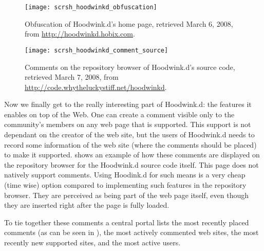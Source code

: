 \begin{figure}
  \centering
  \texttt{[image: scrsh\_hoodwinkd\_obfuscation]}
  \caption[Hoodwink.d Obfuscation]{
    Obfuscation of Hoodwink.d's home page,
    retrieved March 6, 2008, from
    \url{http://hoodwinkd.hobix.com}.
  }
  \label{figure:scrsh.hoodwinkd.obfuscation}
\end{figure}

\begin{figure}
  \begin{whole}
    \centering
    \texttt{[image: scrsh\_hoodwinkd\_comment\_source]}
    \caption[Hoodwink.d Comments]{
      Comments on the repository browser of Hoodwink.d's source code,
      retrieved March 7, 2008, from
      \url{http://code.whytheluckystiff.net/hoodwinkd}.
    }
    \label{figure:scrsh.hoodwinkd.comment.source}
  \end{whole}
\end{figure}

Now we finally get to the really interesting part of Hoodwink.d: the features
it enables on top of the Web. One can create a comment visible only to the
community's members on any web page that is supported. This support is not
dependant on the creator of the web site, but the users of Hoodwink.d needs to
record some information of the web site (where the comments should be placed)
to make it supported.  shows an
example of how these comments are displayed on the repository browser for
the Hoodwink.d source code itself. This page does not natively support
comments. Using Hoodink.d for such means is a very cheap (time wise) option
compared to implementing such features in the repository browser.
They are perceived as being part of the web page itself, even though they
are inserted right after the page is fully loaded.

To tie together these comments a central portal lists
the most recently placed comments (as can be seen in
), the most actively commented web
sites, the most recently new supported sites, and the most active users.

